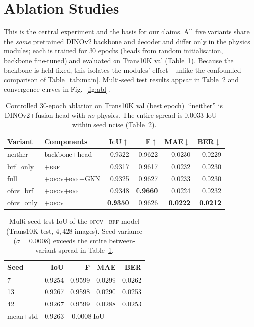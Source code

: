 \documentclass{bmvc2k}
\newcommand{\ofcv}{\textsc{ofcv}}
\newcommand{\brf}{\textsc{brf}}
\newcommand{\dinov}{DINOv2}
\newcommand{\iou}{IoU}
\newcommand{\best}[1]{\textbf{#1}}
\begin{document}
\section{Ablation Studies}
\label{sec:ablation}
This is the central experiment and the basis for our claims. All five variants
share the \emph{same} pretrained \dinov{} backbone and decoder and differ only in
the physics modules; each is trained for $30$ epochs (heads from random
initialisation, backbone fine-tuned) and evaluated on Trans10K val
(Table~\ref{tab:ablation}). Because the backbone is held fixed, this isolates the
modules' effect---unlike the confounded comparison of Table~\ref{tab:main}.
Multi-seed test results appear in Table~\ref{tab:seeds} and convergence curves in
Fig.~\ref{fig:abl}.

\begin{table}[t]
\centering
\caption{Controlled 30-epoch ablation on Trans10K val (best epoch).
``neither'' is \dinov{}+fusion head with \emph{no} physics. The entire spread is
$0.0033$ \iou---within seed noise (Table~\ref{tab:seeds}).}
\label{tab:ablation}
\setlength{\tabcolsep}{4pt}
\begin{tabular}{llrrrr}
\toprule
Variant & Components & \iou$\uparrow$ & F$\uparrow$ & MAE$\downarrow$ & BER$\downarrow$ \\
\midrule
neither   & backbone+head     & 0.9322 & 0.9622 & 0.0230 & 0.0229 \\
brf\_only & {+}\brf           & 0.9317 & 0.9617 & 0.0232 & 0.0230 \\
full      & {+}\ofcv{+}\brf{+}GNN & 0.9325 & 0.9627 & 0.0233 & 0.0230 \\
ofcv\_brf & {+}\ofcv{+}\brf   & 0.9348 & \best{0.9660} & 0.0224 & 0.0232 \\
ofcv\_only& {+}\ofcv          & \best{0.9350} & 0.9626 & \best{0.0222} & \best{0.0212} \\
\bottomrule
\end{tabular}
\end{table}

\begin{table}[t]
\centering
\caption{Multi-seed test \iou{} of the \ofcv{+}\brf{} model (Trans10K test,
$4{,}428$ images). Seed variance ($\sigma=0.0008$) exceeds the entire
between-variant spread in Table~\ref{tab:ablation}.}
\label{tab:seeds}
\begin{tabular}{lrrrr}
\toprule
Seed & \iou & F & MAE & BER \\
\midrule
7  & 0.9254 & 0.9599 & 0.0299 & 0.0262 \\
13 & 0.9267 & 0.9598 & 0.0290 & 0.0253 \\
42 & 0.9267 & 0.9599 & 0.0288 & 0.0253 \\
\midrule
mean$\pm$std & \multicolumn{4}{l}{$0.9263\pm0.0008$ \iou} \\
\bottomrule
\end{tabular}
\end{table}
\end{document}
